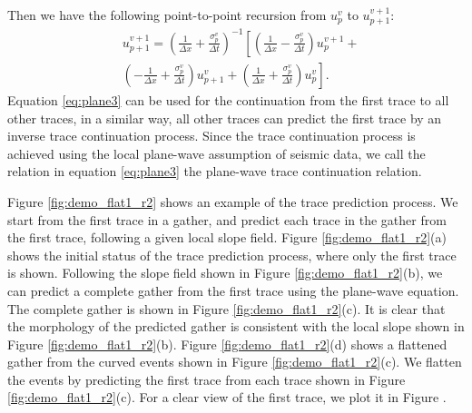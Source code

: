 Then we have the following point-to-point recursion from $u_{p}^{v}$ to $u_{p+1}^{v+1}$:
\begin{equation}
\label{eq:plane3}
\begin{split}
&u_{p+1}^{v+1}=
\left(\frac{1}{\Delta x}+\frac{\sigma_p^v}{\Delta t}\right)^{-1}\left[\left(\frac{1}{\Delta x}-\frac{\sigma_p^v}{\Delta t}\right)u_{p}^{v+1} +\right.\\
&\left.\left(-\frac{1}{\Delta x}+\frac{\sigma_p^v}{\Delta t}\right)u_{p+1}^{v}+
\left(\frac{1}{\Delta x}+\frac{\sigma_p^v}{\Delta t}\right)u_{p}^{v}\right].
\end{split}
\end{equation}
Equation \ref{eq:plane3} can be used for the continuation from the first trace to all other traces, in a similar way, all other traces can predict the first trace by an inverse trace continuation process. Since the trace continuation process is achieved using the local plane-wave assumption of seismic data, we call the relation in equation \ref{eq:plane3} the plane-wave trace continuation relation.

Figure \ref{fig:demo_flat1_r2} shows an example of the trace prediction process. We start from the first trace in a gather, and predict each trace in the gather from the first trace, following a given local slope field.  Figure \ref{fig:demo_flat1_r2}(a) shows the initial status of the trace prediction process, where only the first trace is shown. Following the slope field shown in Figure \ref{fig:demo_flat1_r2}(b), we can predict a complete gather from the first trace using the plane-wave equation. The complete gather is shown in Figure \ref{fig:demo_flat1_r2}(c). It is clear that the morphology of the predicted gather is consistent with the local slope shown in Figure \ref{fig:demo_flat1_r2}(b). Figure \ref{fig:demo_flat1_r2}(d) shows a flattened gather from the curved events shown in Figure \ref{fig:demo_flat1_r2}(c). We flatten the events by predicting the first trace from each trace shown in Figure \ref{fig:demo_flat1_r2}(c). For a clear view of the first trace, we plot it in Figure . 

